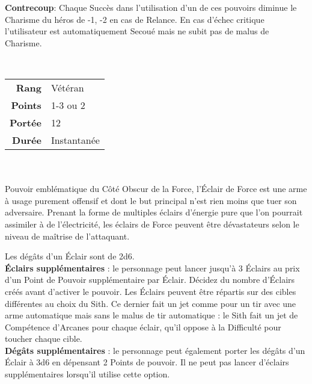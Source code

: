 \textbf{Contrecoup}: Chaque Succès dans l’utilisation d’un de ces pouvoirs diminue le Charisme du héros de -1, -2 en cas de Relance. En cas d’échec critique l’utilisateur est automatiquement Secoué mais ne subit pas de malus de Charisme.

\newpage
\begin{description}[align=left] 

    \item [\'Eclair de Force] ~ \\

        \begin{tabular}{ r l }
            \textbf{Rang}    & Vétéran \\
            \textbf{Points}  & 1-3 ou 2 \\
            \textbf{Portée}  & 12 \\
            \textbf{Durée}   & Instantanée \\
        \end{tabular}
        \\ \\
        Pouvoir emblématique du Côté Obscur de la Force, l’Éclair de Force est une arme à usage purement offensif et dont le but principal n’est rien moins que tuer son adversaire. Prenant la forme de multiples éclairs d’énergie pure que l’on pourrait assimiler à de l’électricité, les éclairs de Force peuvent être dévastateurs selon le niveau de maîtrise de l’attaquant. 

        Les dégâts d’un Éclair sont de 2d6. \\
        
        \textbf{Éclairs supplémentaires} : le personnage peut lancer jusqu’à 3 Éclairs au prix d’un Point de Pouvoir supplémentaire par Éclair. Décidez du nombre d’Éclairs créés avant d’activer le pouvoir. Les Éclairs peuvent être répartis sur des cibles différentes au choix du Sith. Ce dernier fait un jet comme pour un tir avec une arme automatique mais sans le malus de tir automatique : le Sith fait un jet de Compétence d’Arcanes pour chaque éclair, qu’il oppose à la Difficulté pour toucher chaque cible.\\
        
        \textbf{Dégâts supplémentaires} : le personnage peut également porter les dégâts d’un Éclair à 3d6 en dépensant 2 Points de pouvoir. Il ne peut pas lancer d’éclairs supplémentaires lorsqu’il utilise cette option.
        \\

    \item [\'Etranglement de Force] ~ \\


\end{description}
